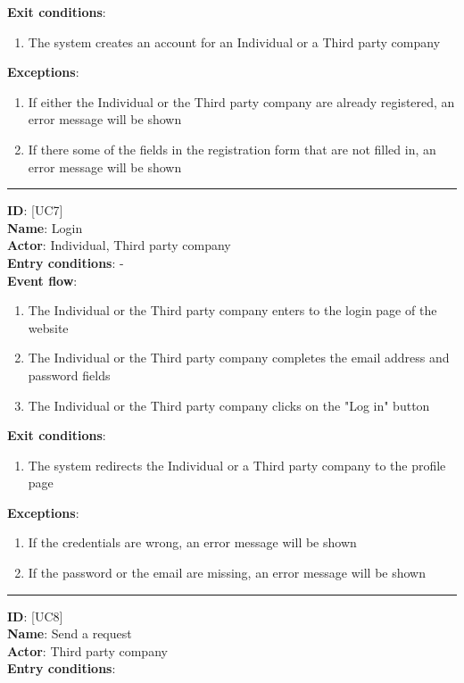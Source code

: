 \documentclass[hidelinks, 12pt]{report}
\newcommand\usecase[1]{ [UC#1] }
\begin{document}
\begin{itemize}
\begin{enumerate}
		\end{enumerate}
		\textbf{Exit conditions}:
		\begin{enumerate}
			\item{The system creates an account for an Individual or a Third party company}
		\end{enumerate}
		\textbf{Exceptions}:
		\begin{enumerate}
			\item{If either the Individual or the Third party company are already registered, an error message will be shown}
			\item{If there some of the fields in the registration form that are not filled in, an error message will be shown}
		\end{enumerate}
		\rule{\linewidth}{0.4pt}
		\textbf{ID}: \usecase{7} \\
		\textbf{Name}: Login \\
		\textbf{Actor}: Individual, Third party company \\
		\textbf{Entry conditions}: - \\
		\textbf{Event flow}:
		\begin{enumerate}
			\item{The Individual or the Third party company enters to the login page of the website}
			\item{The Individual or the Third party company completes the email address and password fields}
			\item{The Individual or the Third party company clicks on the "Log in" button}
		\end{enumerate}
		\textbf{Exit conditions}:
		\begin{enumerate}
			\item{The system redirects the Individual or a Third party company to the profile page}
		\end{enumerate}
		\textbf{Exceptions}:
		\begin{enumerate}
			\item{If the credentials are wrong, an error message will be shown}
			\item{If the password or the email are missing, an error message will be shown}
		\end{enumerate}
		\rule{\linewidth}{0.4pt}
		\textbf{ID}: \usecase{8} \\
		\textbf{Name}: Send a request \\
		\textbf{Actor}: Third party company \\
		\textbf{Entry conditions}:
		\begin{enumerate}

\end{enumerate}
\end{itemize}
\end{document}
